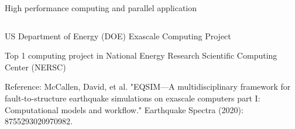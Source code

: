 \documentclass[hangout,aspectratio=1610,10pt]{beamer}
\begin{document}
\begin{frame}{High performance computing and parallel application}
\begin{columns}
\begin{column}{.5\columnwidth}
		US Department of Energy (DOE) Exascale Computing Project
		
		Top 1 computing project in National Energy Research Scientific Computing Center (NERSC)
		\vspace{10pt}
		

		\tiny{Reference: McCallen, David, et al. "EQSIM—A multidisciplinary framework for fault-to-structure earthquake simulations on exascale computers part I: Computational models and workflow." Earthquake Spectra (2020): 8755293020970982.}


		
	\end{column}
\end{columns}
\end{frame}
\end{document}
